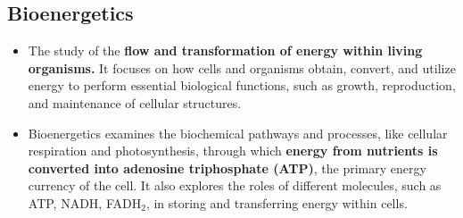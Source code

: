 \documentclass[10pt]{article}
\begin{document}
\subsection*{Bioenergetics}
\begin{itemize}
    \item The study of the \textbf{flow and transformation of energy within living organisms.}  It focuses on how cells and organisms obtain, convert, and utilize energy to perform essential biological functions, such as growth, reproduction, and maintenance of cellular structures.
    \item Bioenergetics examines the biochemical pathways and processes, like cellular respiration and photosynthesis, through which \textbf{energy from nutrients is converted into adenosine triphosphate (ATP)}, the primary energy currency of the cell.  It also explores the roles of different molecules, such as ATP, NADH, FADH$_2$, in storing and transferring energy within cells.
\end{itemize}
\end{document}
